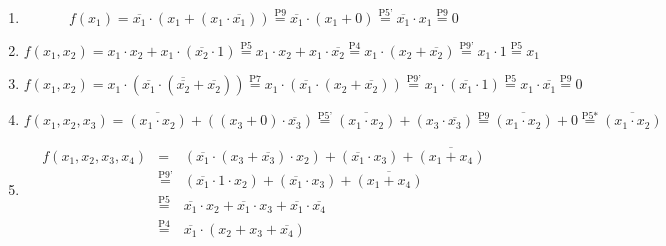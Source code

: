 \documentclass[DIN, pagenumber=false, fontsize=11pt, parskip=half]{scrartcl}
\begin{document}
    \subsection{}
    \begin{enumerate}[label=(\alph*)]
        \item
            \begin{equation*}
                f(x_1) = \overline{x_1} \cdot (x_1 + (x_1 \cdot \overline{x_1})) \stackrel{\text{P9}}{=} \overline{x_1} \cdot (x_1 + 0) \stackrel{\text{P5'}}{=} \overline{x_1} \cdot x_1 \stackrel{\text{P9}}{=} 0
            \end{equation*}
        \item 
            \begin{equation*}
                f(x_1, x_2) = x_1 \cdot x_2 + x_1 \cdot (\overline{x_2} \cdot 1) \stackrel{\text{P5}}{=} x_1 \cdot x_2 + x_1 \cdot \overline{x_2} \stackrel{\text{P4}}{=} x_1 \cdot (x_2 + \overline{x_2})
                \stackrel{\text{P9'}}{=} x_1 \cdot 1 \stackrel{\text{P5}}{=} x_1
            \end{equation*}
        \item 
            \begin{equation*}
                f(x_1, x_2) = x_1 \cdot (\overline{x_1} \cdot (\overline{\overline{x_2}} + \overline{x_2})) \stackrel{\text{P7}}{=} 
                    x_1 \cdot (\overline{x_1} \cdot (x_2 + \overline{x_2})) \stackrel{\text{P9'}}{=} x_1 \cdot (\overline{x_1} \cdot 1) \stackrel{\text{P5}}{=} 
                    x_1 \cdot \overline{x_1} \stackrel{\text{P9}}{=} 0
            \end{equation*}
        \item 
            \begin{equation*}
                f(x_1, x_2, x_3) = \overline{(x_1 \cdot x_2)} + ((x_3 + 0) \cdot \overline{x_3})
                \stackrel{\text{P5'}}{=} \overline{(x_1 \cdot x_2)} + (x_3 \cdot \overline{x_3})
                \stackrel{\text{P9}}{=} \overline{(x_1 \cdot x_2)} + 0
                \stackrel{\text{P5*}}{=} \overline{(x_1 \cdot x_2)}
            \end{equation*}
        \item 
            \begin{eqnarray*}
                f(x_1, x_2, x_3, x_4) &=& (\overline{x_1} \cdot (x_3 + \overline{x_3}) \cdot x_2) + (\overline{x_1} \cdot x_3) + \overline{(x_1 + x_4)} \\
                &\stackrel{\text{P9'}}{=}& (\overline{x_1} \cdot 1 \cdot x_2) + (\overline{x_1} \cdot x_3) + \overline{(x_1 + x_4)} \\
                &\stackrel{\text{P5}}{=}& \overline{x_1} \cdot x_2 + \overline{x_1} \cdot x_3 + \overline{x_1} \cdot \overline{x_4} \\
                &\stackrel{\text{P4}}{=}& \overline{x_1} \cdot (x_2 + x_3 +  \overline{x_4})
            \end{eqnarray*}
    \end{enumerate}
\end{document}
